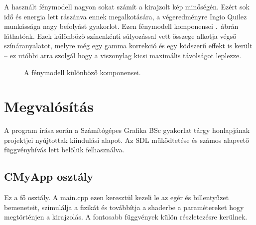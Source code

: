 A használt fénymodell nagyon sokat számít a kirajzolt kép minőségén. Ezért sok idő és energia lett rászánva ennek megalkotására, a végeredményre Ingio Quilez munkássága \cite{iqShader82:online} nagy befolyást gyakorlot. Ezen fénymodell komponensei .~ábrán láthatóak. Ezek különböző színenkénti súlyozással vett összege alkotja végső színáranyalatot, melyre még egy gamma korrekció és egy ködszerű effekt is került -- ez utóbbi arra szolgál hogy a viszonylag kicsi maximális távolságot leplezze.

\begin{figure}[H]
	\centering
	\hspace{1pt}
	\hspace{1pt}
	\vspace{1pt}
	\hspace{1pt}
	\hspace{1pt}
	\vspace{1pt}
	\hspace{1pt}
	\caption{A fénymodell különböző komponensei.}
	\label{fig:lighting}
\end{figure}


\section{Megvalósítás}

A program írása során a Számítógépes Grafika BSc gyakorlat tárgy honlapjának \cite{GrafikaB26:online} projektjei nyújtottak kiindulási alapot. Az SDL működtetése és számos alapvető függvényhívás lett belőlük felhasználva.

\subsection{CMyApp osztály}

Ez a fő osztály. A main.cpp ezen keresztül kezeli le az egér és billentyűzet bemeneteit, szimulálja a fizikát és továbbítja a shaderbe a paramétereket hogy megtörténjen a kirajzolás. A fontosabb függvények külön részletezésre kerülnek.

